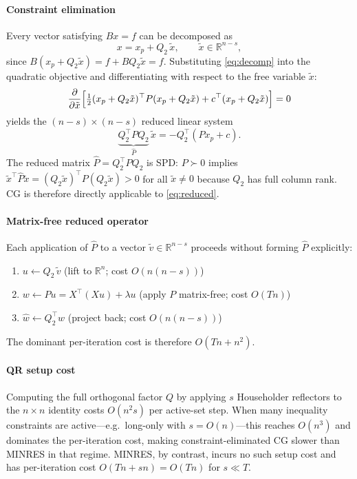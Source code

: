 \documentclass[11pt]{article}
\begin{document}
\paragraph{Constraint elimination}
Every vector satisfying $Bx = f$ can be decomposed as
\begin{equation}\label{eq:decomp}
x = x_p + Q_2\,\tilde{x}, \qquad \tilde{x} \in \mathbb{R}^{n-s},
\end{equation}
since $B(x_p + Q_2\tilde{x}) = f + B Q_2\tilde{x} = f$. Substituting
\eqref{eq:decomp} into the quadratic objective and differentiating with respect to
the free variable $\tilde{x}$:
\[
\frac{\partial}{\partial\tilde{x}}\Bigl[
  \tfrac{1}{2}(x_p + Q_2\tilde{x})^\top P(x_p + Q_2\tilde{x})
  + c^\top(x_p + Q_2\tilde{x})
\Bigr] = 0
\]
yields the $(n-s) \times (n-s)$ reduced linear system
\begin{equation}\label{eq:reduced}
\underbrace{Q_2^\top P Q_2}_{\hat P}\,\tilde{x}
= -Q_2^\top(P x_p + c).
\end{equation}
The reduced matrix $\hat{P} = Q_2^\top P Q_2$ is SPD: $P \succ 0$ implies
$\tilde{x}^\top \hat{P}\tilde{x} = (Q_2\tilde{x})^\top P(Q_2\tilde{x}) > 0$ for all
$\tilde{x} \ne 0$ because $Q_2$ has full column rank. CG is therefore directly
applicable to \eqref{eq:reduced}.

\paragraph{Matrix-free reduced operator}
Each application of $\hat{P}$ to a vector $\tilde{v} \in \mathbb{R}^{n-s}$ proceeds
without forming $\hat{P}$ explicitly:
\begin{enumerate}
  \item $u \leftarrow Q_2\,\tilde{v}$ \hfill (lift to $\mathbb{R}^n$; cost $O(n(n-s))$)
  \item $w \leftarrow Pu = X^\top(Xu) + \lambda u$ \hfill (apply $P$ matrix-free; cost $O(Tn)$)
  \item $\hat{w} \leftarrow Q_2^\top w$ \hfill (project back; cost $O(n(n-s))$)
\end{enumerate}
The dominant per-iteration cost is therefore $O(Tn + n^2)$.

\paragraph{QR setup cost}
Computing the full orthogonal factor $Q$ by applying $s$ Householder reflectors to the
$n \times n$ identity costs $O(n^2 s)$ per active-set step. When many inequality
constraints are active---e.g.\ long-only with $s = O(n)$---this reaches $O(n^3)$ and
dominates the per-iteration cost, making constraint-eliminated CG slower than MINRES in
that regime. MINRES, by contrast, incurs no such setup cost and has per-iteration cost
$O(Tn + sn) = O(Tn)$ for $s \ll T$.
\end{document}
